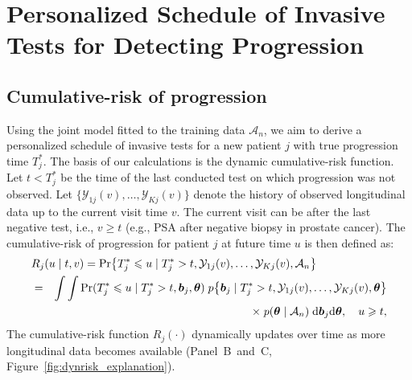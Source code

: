 \section{Personalized Schedule of Invasive Tests for Detecting Progression} 
\label{sec:schedule}

\subsection{Cumulative-risk of progression} 
\label{subsec:cum_risk}
Using the joint model fitted to the training data $\mathcal{A}_n$, we aim to derive a personalized schedule of invasive tests for a new patient $j$ with true progression time $T^*_j$. The basis of our calculations is the dynamic cumulative-risk function. Let $t < T^*_j$ be the time of the last conducted test on which progression was not observed. Let $\{\mathcal{Y}_{1j}(v), \ldots, \mathcal{Y}_{Kj}(v)\}$ denote the history of observed longitudinal data up to the current visit time $v$. The current visit can be after the last negative test, i.e., $v \geq t$ (e.g., PSA after negative biopsy in prostate cancer). The cumulative-risk of progression for patient $j$ at future time $u$ is then defined as:
\begin{eqnarray}
\label{eq:cumulative_risk}
\nonumber \lefteqn{R_j(u \mid t, v) = \mbox{Pr}\big\{T^*_j \leq u \mid T^*_j > t, \mathcal{Y}_{1j}(v), \ldots, \mathcal{Y}_{Kj}(v), \mathcal{A}_n\big\}}\\
\nonumber & = & \int \int \mbox{Pr}(T^*_j \leq u \mid T^*_j > t, \boldsymbol{b}_{j}, \boldsymbol{\theta}) \; p\big\{\boldsymbol{b}_j \mid T^*_j > t, \mathcal{Y}_{1j}(v), \ldots, \mathcal{Y}_{Kj}(v), \boldsymbol{\theta} \big\}\\
& & \quad \quad \times \; p(\boldsymbol{\theta} \mid \mathcal{A}_n) \; \mathrm{d}\boldsymbol{b}_j \mathrm{d}\boldsymbol{\theta}, \quad u \geq t,
\end{eqnarray}
The cumulative-risk function $R_j(\cdot)$ dynamically updates over time as more longitudinal data becomes available (Panel~B~and~C, Figure~\ref{fig:dynrisk_explanation}).
